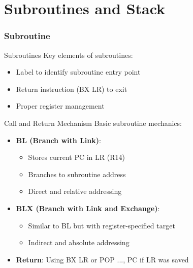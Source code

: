 \section{Subroutines and Stack}

\subsubsection{Subroutine}

\begin{concept}{Subroutines}
Key elements of subroutines:
\begin{itemize}
  \item Label to identify subroutine entry point
  \item Return instruction (BX LR) to exit
  \item Proper register management
\end{itemize}
\end{concept}





\begin{concept}{Call and Return Mechanism}
Basic subroutine mechanics:
\begin{itemize}
  \item \textbf{BL (Branch with Link)}:
    \begin{itemize}
      \item Stores current PC in LR (R14)
      \item Branches to subroutine address
      \item Direct and relative addressing
    \end{itemize}
  \item \textbf{BLX (Branch with Link and Exchange)}:
    \begin{itemize}
      \item Similar to BL but with register-specified target
      \item Indirect and absolute addressing
    \end{itemize}
  \item \textbf{Return}: Using BX LR or POP {..., PC} if LR was saved
\end{itemize}
\end{concept}

